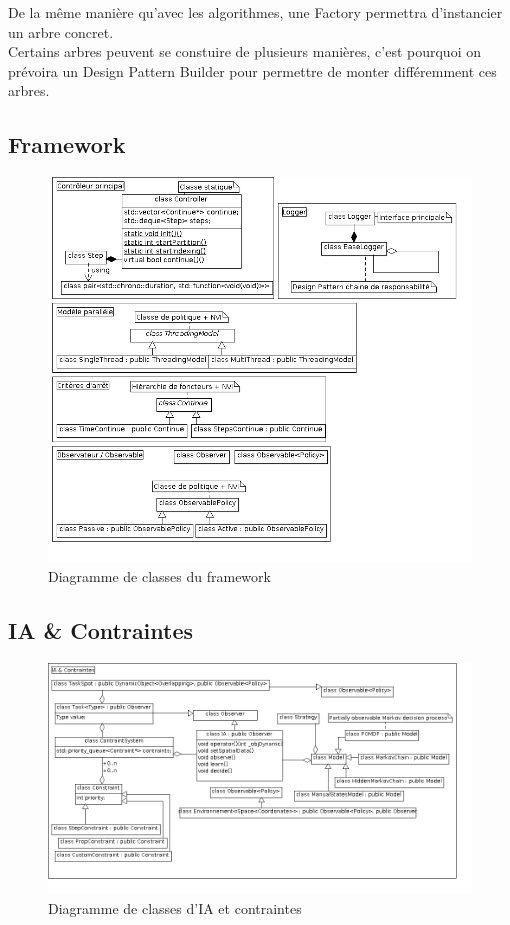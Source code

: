 De la même manière qu'avec les algorithmes, une Factory permettra d'instancier un arbre concret.\\
Certains arbres peuvent se constuire de plusieurs manières, c'est pourquoi on prévoira un Design Pattern Builder pour permettre de monter différemment ces arbres.

\newpage
\subsection{Framework}
\begin{figure}[!h]\centering
   \includegraphics[angle=90, scale=0.6]{images/c_framework.png}
   \caption{\label{c_framework} Diagramme de classes du framework}
\end{figure}

\newpage
\subsection{IA \& Contraintes}
\begin{figure}[!h]\centering
   \includegraphics[angle=90, scale=0.5]{images/c_ia_contraintes.png}
   \caption{\label{c_ia_contraintes} Diagramme de classes d'IA et contraintes}
\end{figure}

